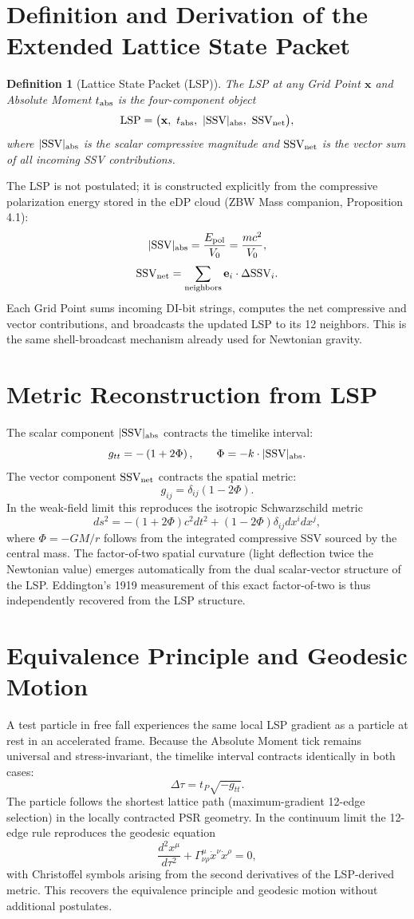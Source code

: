 \documentclass[12pt]{article}
\newtheorem{definition}[theorem]{Definition}
\newcommand{\tP}{t_P}
\newcommand{\SSV}{\text{SSV}}
\newcommand{\LSP}{\text{LSP}}
\begin{document}
\section{Definition and Derivation of the Extended Lattice State Packet}
\begin{definition}[Lattice State Packet (LSP)]
The LSP at any Grid Point \(\mathbf{x}\) and Absolute Moment \(t_{\rm abs}\) is the four-component object
\[
\LSP = \bigl(\mathbf{x},\ t_{\rm abs},\ |\SSV|_{\rm abs},\ \SSV_{\rm net}\bigr),
\]
where \(|\SSV|_{\rm abs}\) is the scalar compressive magnitude and \(\SSV_{\rm net}\) is the vector sum of all incoming SSV contributions.
\end{definition}

The LSP is not postulated; it is constructed explicitly from the compressive polarization energy stored in the eDP cloud (ZBW Mass companion, Proposition 4.1):
\[
|\SSV|_{\rm abs} = \frac{E_{\rm pol}}{V_0} = \frac{mc^2}{V_0},
\]
\[
\SSV_{\rm net} = \sum_{\text{neighbors}} \mathbf{e}_i \cdot \Delta\SSV_i.
\]
Each Grid Point sums incoming DI-bit strings, computes the net compressive and vector contributions, and broadcasts the updated LSP to its 12 neighbors. This is the same shell-broadcast mechanism already used for Newtonian gravity.

\section{Metric Reconstruction from LSP}
The scalar component \(|\SSV|_{\rm abs}\) contracts the timelike interval:
\[
g_{tt} = -\left(1 + 2\Phi\right), \qquad \Phi = -k \cdot |\SSV|_{\rm abs}.
\]
The vector component \(\SSV_{\rm net}\) contracts the spatial metric:
\[
g_{ij} = \delta_{ij} \left(1 - 2\Phi\right).
\]
In the weak-field limit this reproduces the isotropic Schwarzschild metric
\[
ds^2 = -\left(1 + 2\Phi\right) c^2 dt^2 + \left(1 - 2\Phi\right) \delta_{ij} dx^i dx^j,
\]
where \(\Phi = -GM/r\) follows from the integrated compressive SSV sourced by the central mass. The factor-of-two spatial curvature (light deflection twice the Newtonian value) emerges automatically from the dual scalar-vector structure of the LSP. Eddington’s 1919 measurement of this exact factor-of-two is thus independently recovered from the LSP structure.

\section{Equivalence Principle and Geodesic Motion}
A test particle in free fall experiences the same local LSP gradient as a particle at rest in an accelerated frame. Because the Absolute Moment tick remains universal and stress-invariant, the timelike interval contracts identically in both cases:
\[
\Delta\tau = \tP \sqrt{-g_{tt}}.
\]
The particle follows the shortest lattice path (maximum-gradient 12-edge selection) in the locally contracted PSR geometry. In the continuum limit the 12-edge rule reproduces the geodesic equation
\[
\frac{d^2x^\mu}{d\tau^2} + \Gamma^\mu_{\nu\rho} \dot{x}^\nu \dot{x}^\rho = 0,
\]
with Christoffel symbols arising from the second derivatives of the LSP-derived metric. This recovers the equivalence principle and geodesic motion without additional postulates.
\end{document}
